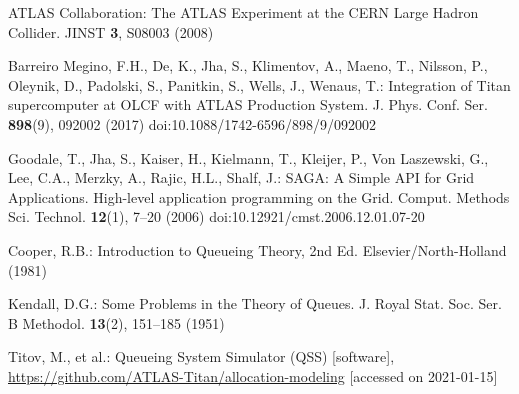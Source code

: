 ATLAS Collaboration: The ATLAS Experiment at the CERN Large Hadron Collider. JINST \textbf{3}, S08003 (2008)

Barreiro Megino, F.H., De, K., Jha, S., Klimentov, A., Maeno, T., Nilsson, P., Oleynik, D., Padolski, S., Panitkin, S., Wells, J., Wenaus, T.: Integration of Titan supercomputer at OLCF with ATLAS Production System. J. Phys. Conf. Ser. \textbf{898}(9), 092002 (2017) doi:10.1088/1742-6596/898/9/092002

Goodale, T., Jha, S., Kaiser, H., Kielmann, T., Kleijer, P., Von Laszewski, G., Lee, C.A., Merzky, A., Rajic, H.L., Shalf, J.: SAGA: A Simple API for Grid Applications. High-level application programming on the Grid. Comput. Methods Sci. Technol. \textbf{12}(1), 7--20 (2006) doi:10.12921/cmst.2006.12.01.07-20

Cooper, R.B.: Introduction to Queueing Theory, 2nd Ed. Elsevier/North-Holland (1981)

Kendall, D.G.: Some Problems in the Theory of Queues. J. Royal Stat. Soc. Ser. B Methodol. \textbf{13}(2), 151--185 (1951)

Titov, M., et al.: Queueing System Simulator (QSS) [software], \url{https://github.com/ATLAS-Titan/allocation-modeling} [accessed on 2021-01-15]

